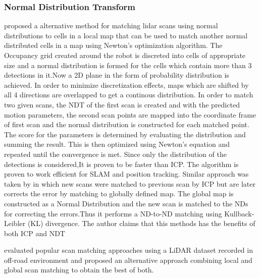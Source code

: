 \subsubsection*{Normal Distribution Transform}
    \cite{P.Biber} proposed a alternative method for matching lidar scans using normal distributions to cells in a local map that can be used to match another normal distributed cells in a map using Newton's optimization 
algorithm. The Occupancy grid created around the robot is discreted into cells of appropriate size and a normal distribution is formed for the cells which contain more than 3 detections in it.Now a 2D plane in 
the form of probability distribution is achieved. In order to minimize discretization effects, maps which are shifted by all 4 directions are overlapped to get a continous distribution.
    In order to match two given scans, the NDT of the first scan is created and with the predicted motion parameters, the second scan points are mapped into the coordinate frame of first 
scan and the normal distribution is constructed for each matched point. The score for the parameters is determined by evaluating the distribution and summing the result. This is then optimized using
Newton's equation and repeated until the convergence is met. Since only the distribution of the detections is considered,It is proven to be faster than ICP.
 The algorithm is proven to work efficient for SLAM and position tracking.
    Similar approach was taken by \cite{K.Ryu} in which new scans were matched to previous scan by ICP but are later corrects the error by matching to globally defined map. The global map is constructed as a
Normal Distribution and the new scan is matched to the NDs for correcting the errors.Thus it performs a ND-to-ND matching using Kullback-Leibler (KL) divergence.
The author claims that this methods has the benefits of both ICP and NDT
\par
\cite{HaoFU} evaluated popular scan matching approaches using a LiDAR dataset recorded in off-road environment and proposed an alternative approach combining local and global  scan matching to obtain the 
best of both.

